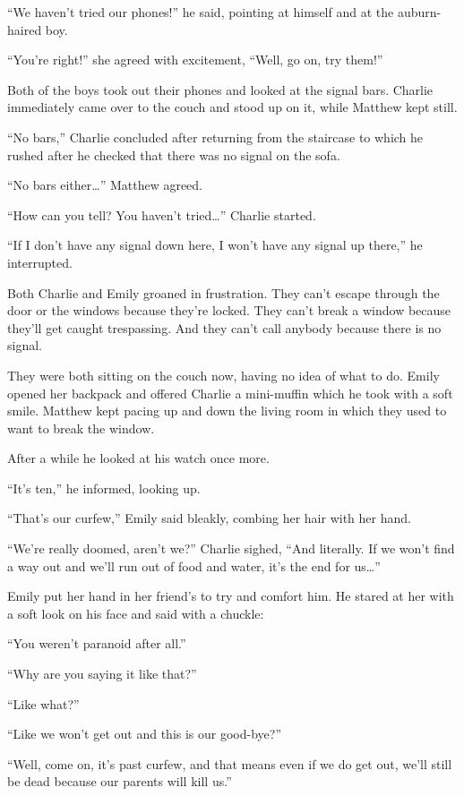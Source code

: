 “We haven't tried our phones!” he said, pointing at himself and at the auburn-haired boy.

“You're right!” she agreed with excitement, “Well, go on, try them!”

Both of the boys took out their phones and looked at the signal bars. Charlie immediately came over to the couch and stood up on it, while Matthew kept still.

“No bars,” Charlie concluded after returning from the staircase to which he rushed after he checked that there was no signal on the sofa.

“No bars either…” Matthew agreed.

“How can you tell? You haven't tried…” Charlie started.

“If I don't have any signal down here, I won't have any signal up there,” he interrupted.

Both Charlie and Emily groaned in frustration. They can't escape through the door or the windows because they're locked. They can't break a window because they'll get caught trespassing. And they can't call anybody because there is no signal.

They were both sitting on the couch now, having no idea of what to do. Emily opened her backpack and offered Charlie a mini-muffin which he took with a soft smile. Matthew kept pacing up and down the living room in which they used to want to break the window.

After a while he looked at his watch once more.

“It's ten,” he informed, looking up.

“That's our curfew,” Emily said bleakly, combing her hair with her hand.

“We're really doomed, aren't we?” Charlie sighed, “And literally. If we won't find a way out and we'll run out of food and water, it's the end for us…”

Emily put her hand in her friend's to try and comfort him. He stared at her with a soft look on his face and said with a chuckle:

“You weren't paranoid after all.”

“Why are you saying it like that?”

“Like what?”

“Like we won't get out and this is our good-bye?”

“Well, come on, it's past curfew, and that means even if we do get out, we'll still be dead because our parents will kill us.”

